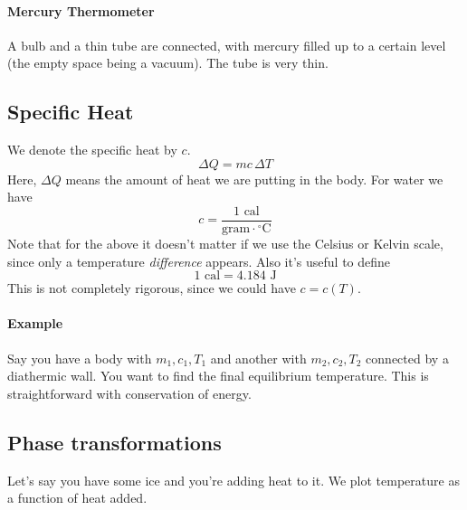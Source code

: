 \documentclass{report}
\numberwithin{equation}{section}
\begin{document}
\paragraph{Mercury Thermometer} A bulb and a thin tube are connected, with mercury filled up to a certain level (the empty space being a vacuum). The tube
is very thin.
\subsection{Specific Heat}
We denote the specific heat by $c$.
\begin{equation}
    \Delta Q = mc \,\Delta T
\end{equation}
Here, $\Delta Q$ means the amount of heat we are putting in the body. For water we have
\begin{equation*}
    c = \frac{1 \text{ cal}}{\text{gram}\cdot{}^{\circ}\text{C} }
\end{equation*}
Note that for the above it doesn't matter if we use the Celsius or Kelvin scale, since only a temperature \emph{difference} appears. Also it's useful to define
\begin{equation}
    1\text{ cal} = 4.184 \text{ J}
\end{equation}
This is not completely rigorous, since we could have $c = c(T)$.
\paragraph{Example} Say you have a body with $m_1,c_1,T_1$ and another with $m_2,c_2,T_2$ connected by a diathermic wall. You want to find
the final equilibrium temperature. This is straightforward with conservation of energy.
\subsection{Phase transformations} Let's say you have some ice and you're adding heat to it. We plot temperature as a function of heat added.
\end{document}
